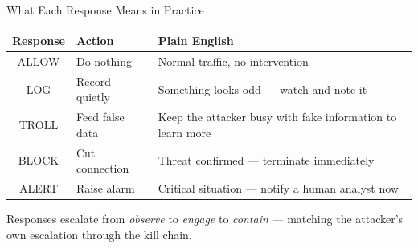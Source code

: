 \documentclass[aspectratio=169, 12pt]{beamer}
\begin{document}
\begin{frame}{What Each Response Means in Practice}
  \begin{table}
    \centering
    \begin{tabular}{clp{6.5cm}}
      \toprule
      \textbf{Response} & \textbf{Action} & \textbf{Plain English} \\
      \midrule
      ALLOW & Do nothing  & Normal traffic, no intervention \\
      LOG   & Record quietly & Something looks odd --- watch and note it \\
      TROLL & Feed false data & Keep the attacker busy with fake information to learn more \\
      BLOCK & Cut connection & Threat confirmed --- terminate immediately \\
      ALERT & Raise alarm   & Critical situation --- notify a human analyst now \\
      \bottomrule
    \end{tabular}
  \end{table}
  \vspace{0.3cm}
  \begin{center}
    \textcolor{honeygrey}{\small Responses escalate from \emph{observe} to \emph{engage} to \emph{contain} ---
    matching the attacker's own escalation through the kill chain.}
  \end{center}
\end{frame}
\end{document}
